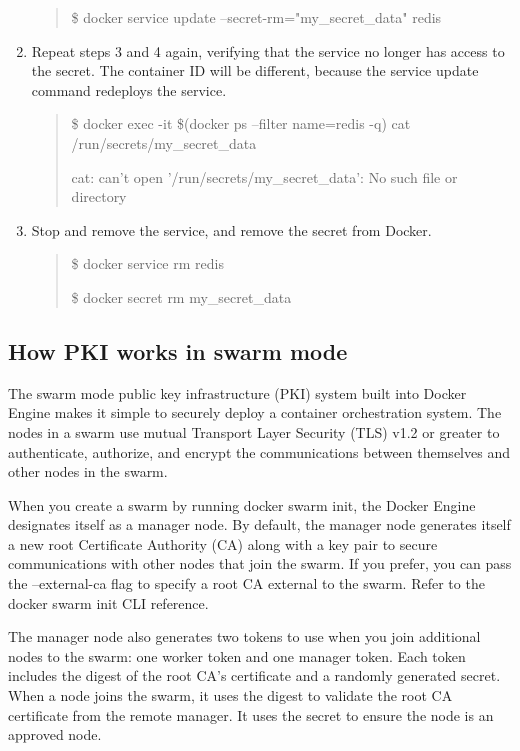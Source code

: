 \begin{enumerate}
\begin{quote}
\$ docker service update --secret-rm="my\_secret\_data" redis
\end{quote}

\item
Repeat steps 3 and 4 again, verifying that the service no longer has access
to the secret. The container ID will be different, because the service
update command redeploys the service.

\begin{quote}
\$ docker exec -it \$(docker ps --filter name=redis -q) cat
/run/secrets/my\_secret\_data

cat: can't open '/run/secrets/my\_secret\_data': No such file or directory
\end{quote}

\item
Stop and remove the service, and remove the secret from Docker.

\begin{quote}
\$ docker service rm redis

\$ docker secret rm my\_secret\_data
\end{quote}

\end{enumerate}




\subsection{How PKI works in swarm mode}



The swarm mode public key infrastructure (PKI) system built into Docker
Engine makes it simple to securely deploy a container orchestration system.
The nodes in a swarm use mutual Transport Layer Security (TLS) v1.2 or
greater to authenticate, authorize, and encrypt the communications between 
themselves and other nodes in the swarm.

When you create a swarm by running docker swarm init, the Docker Engine
designates itself as a manager node. By default, the manager node generates
itself a new root Certificate Authority (CA) along with a key pair to
secure communications with other nodes that join the swarm. If you prefer,
you can pass the --external-ca flag to specify a root CA external to the
swarm. Refer to the docker swarm init CLI reference.

The manager node also generates two tokens to use when you join additional
nodes to the swarm: one worker token and one manager token. Each token
includes the digest of the root CA’s certificate and a randomly generated
secret. When a node joins the swarm, it uses the digest to validate the
root CA certificate from the remote manager. It uses the secret to ensure
the node is an approved node.

